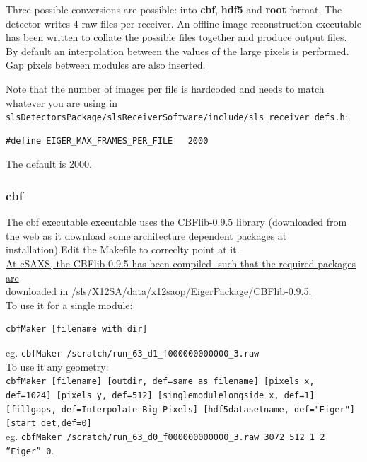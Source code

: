 \documentclass{article}
\begin{document}
Three possible conversions are possible: into \textbf{cbf}, \textbf{hdf5} and \textbf{root} format. The detector writes 4 raw files per receiver. An offline image reconstruction executable has been written to collate the possible files together and produce output files. By default an interpolation between the values of the large pixels is performed. Gap pixels between modules are also inserted.

Note that the number of images per file is hardcoded and needs to match whatever you are using in {\tt{slsDetectorsPackage/slsReceiverSoftware/include/sls\_receiver\_defs.h}}:
\begin{verbatim}
#define EIGER_MAX_FRAMES_PER_FILE	2000
\end{verbatim}
The default is 2000.

\subsubsection{cbf}
The cbf executable executable uses the CBFlib-0.9.5 library (downloaded from the web as it download some architecture dependent packages at installation).Edit the Makefile to correclty point at it.\\
\underline{At cSAXS, the CBFlib-0.9.5 has been compiled -such that the required packages are}\\\underline{ downloaded in /sls/X12SA/data/x12saop/EigerPackage/CBFlib-0.9.5.}\\ 

To use it for a single module:
\begin{verbatim}
cbfMaker [filename with dir]
\end{verbatim}
eg.
{\tt{cbfMaker /scratch/run\_63\_d1\_f000000000000\_3.raw}}\\

To use it any geometry:\\
{\tt{cbfMaker [filename] [outdir, def=same as filename] [pixels x, def=1024] [pixels y, def=512] [singlemodulelongside\_x, def=1] [fillgaps, def=Interpolate Big Pixels] [hdf5datasetname, def="Eiger"] [start det,def=0]}}\\
eg.
{\tt cbfMaker /scratch/run\_63\_d0\_f000000000000\_3.raw  3072 512 1 2 ``Eiger'' 0}.\\
\end{document}
